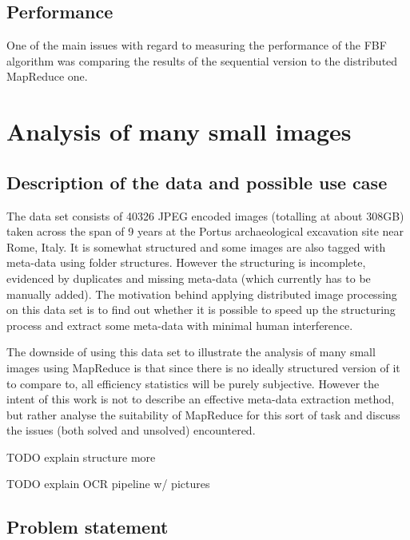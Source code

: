 \documentclass [12pt,a4paper]{report}
\begin{document}
\subsubsection{}

\subsection{Performance}

One of the main issues with regard to measuring the performance of the FBF algorithm was comparing the results of the sequential version to the distributed MapReduce one.

\section{Analysis of many small images}

\subsection{Description of the data and possible use case}

The data set consists of 40326 JPEG encoded images (totalling at about 308GB) taken across the span of 9 years at the Portus archaeological excavation site near Rome, Italy. It is somewhat structured and some images are also tagged with meta-data using folder structures. However the structuring is incomplete, evidenced by duplicates and missing meta-data (which currently has to be manually added). The motivation behind applying distributed image processing on this data set is to find out whether it is possible to speed up the structuring process and extract some meta-data with minimal human interference.

The downside of using this data set to illustrate the analysis of many small images using MapReduce is that since there is no ideally structured version of it to compare to, all efficiency statistics will be purely subjective. However the intent of this work is not to describe an effective meta-data extraction method, but rather analyse the suitability of MapReduce for this sort of task and discuss the issues (both solved and unsolved) encountered.

TODO explain structure more

TODO explain OCR pipeline w/ pictures

\subsection{Problem statement}
\end{document}
